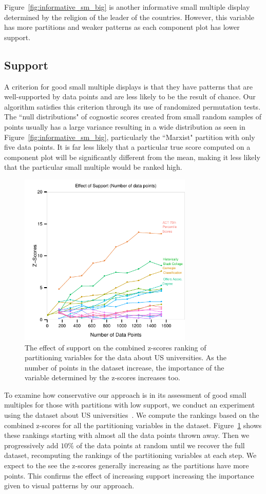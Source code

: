 Figure~\ref{fig:informative_sm_big} is another informative small multiple display determined by the religion of the leader of the countries. However, this variable has more partitions and weaker patterns as each component plot has lower support. 


\subsection{Support}
A criterion for good small multiple displays is that they have patterns that are well-supported by data points and are less likely to be the result of chance. Our algorithm satisfies this criterion through its use of randomized permutation tests. The ``null distributions" of cognostic scores created from small random samples of points usually has a large variance resulting in a wide distribution as seen in Figure~\ref{fig:informative_sm_big}, particularly the ``Marxist" partition with only five data points. It is far less likely that a particular true score computed on a component plot will be significantly different from the mean, making it less likely that the particular small multiple would be ranked high.
\begin{figure}
\centering
\includegraphics[width=3.25in,height=3.25in]{images/support-nogrid.pdf}
  \caption{The effect of support on the combined z-scores ranking of partitioning variables for the data about US universities. As the number of points in the dataset increase, the importance of the variable determined by the z-scores increases too. }
 \label{fig:support}
\end{figure}
To examine how conservative our approach is in its assessment of good small multiples for those with partitions with low support, we conduct an experiment using the dataset about US universities~\cite{IPEDS}. We compute the rankings based on the combined z-scores for all the partitioning variables in the dataset. Figure~\ref{fig:support} shows these rankings starting with almost all the data points thrown away. Then we progressively add $10\%$ of the data points at random until we recover the full dataset, recomputing the rankings of the partitioning variables at each step. We expect to the see the z-scores generally increasing as the partitions have more points. This confirms the effect of increasing support increasing the importance given to visual patterns by our approach.


